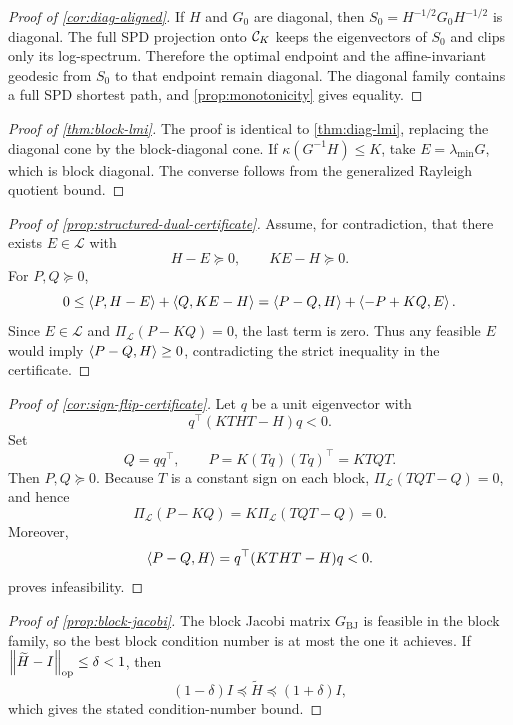 \begin{proof}[Proof of \cref{cor:diag-aligned}]
If \(H\) and \(G_0\) are diagonal, then \(S_0=H^{-1/2}G_0H^{-1/2}\) is diagonal.
The full SPD projection onto \(\mathcal C_K\) keeps the eigenvectors of \(S_0\) and
clips only its log-spectrum. Therefore the optimal endpoint and the
affine-invariant geodesic from \(S_0\) to that endpoint remain diagonal. The
diagonal family contains a full SPD shortest path, and \cref{prop:monotonicity}
gives equality.
\end{proof}

\begin{proof}[Proof of \cref{thm:block-lmi}]
The proof is identical to \cref{thm:diag-lmi}, replacing the diagonal cone by
the block-diagonal cone. If \(\kappa(G^{-1}H)\le K\), take
\(E=\lambda_{\min}G\), which is block diagonal. The converse follows from the
generalized Rayleigh quotient bound.
\end{proof}

\begin{proof}[Proof of \cref{prop:structured-dual-certificate}]
Assume, for contradiction, that there exists \(E\in\mathcal L\) with
\[
  H-E\succeq0,\qquad KE-H\succeq0.
\]
For \(P,Q\succeq0\),
\[
  0
  \le
  \left\langle P,H-E\right\rangle+\left\langle Q,KE-H\right\rangle
  =
  \left\langle P-Q,H\right\rangle+\left\langle -P+KQ,E\right\rangle.
\]
Since \(E\in\mathcal L\) and \(\Pi_{\mathcal L}(P-KQ)=0\), the last term is
zero. Thus any feasible \(E\) would imply \(\left\langle P-Q,H\right\rangle\ge0\), contradicting
the strict inequality in the certificate.
\end{proof}

\begin{proof}[Proof of \cref{cor:sign-flip-certificate}]
Let \(q\) be a unit eigenvector with
\[
  q^\top(KTHT-H)q<0.
\]
Set
\[
  Q=qq^\top,\qquad P=K(Tq)(Tq)^\top=KTQT.
\]
Then \(P,Q\succeq0\). Because \(T\) is a constant sign on each block,
\(\Pi_{\mathcal L}(TQT-Q)=0\), and hence
\[
  \Pi_{\mathcal L}(P-KQ)=K\Pi_{\mathcal L}(TQT-Q)=0.
\]
Moreover,
\[
  \left\langle P-Q,H\right\rangle
  =
  q^\top(KTHT-H)q
  <0.
\]
 proves infeasibility.
\end{proof}

\begin{proof}[Proof of \cref{prop:block-jacobi}]
The block Jacobi matrix \(G_{\mathrm{BJ}}\) is feasible in the block family, so
the best block condition number is at most the one it achieves. If
\(\left\lVert \widetilde H-I\right\rVert_{\operatorname{op}}\le\delta<1\), then
\[
  (1-\delta)I\preceq \widetilde H\preceq (1+\delta)I,
\]
which gives the stated condition-number bound.
\end{proof}

